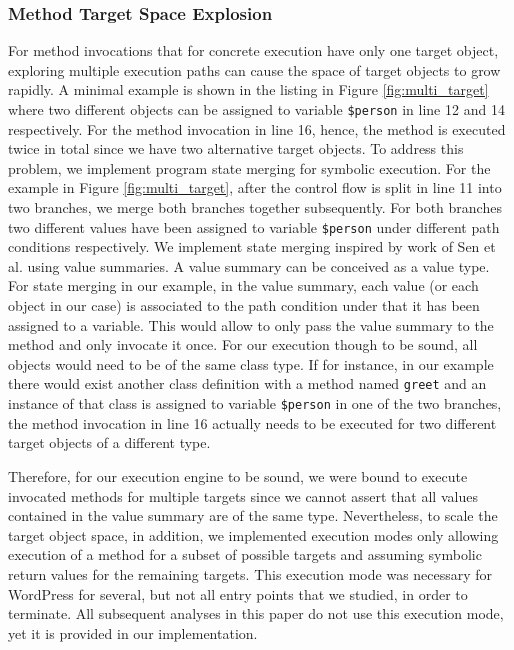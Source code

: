 \documentclass[sigconf]{acmart}
\renewcommand{\sf}[1]{\textsf{#1}}
\renewcommand{\tt}[1]{\texttt{#1}}
\begin{document}
\subsubsection{Method Target Space Explosion}
For method invocations that for concrete execution have only one target object,
exploring multiple execution paths can cause the space of target objects to
grow rapidly. A minimal example is shown in the listing in Figure
\ref{fig:multi_target} where two different objects can be assigned to variable \tt{\$person} in line 12 and
14 respectively. For the method invocation in line 16, hence, the method is
executed twice in total since we have two alternative target objects. To address this problem, we
implement program state merging for symbolic execution. For the example in
Figure \ref{fig:multi_target}, after the control flow is split in line 11 into
two branches, we merge both branches together subsequently. For both branches two different
values have been assigned to variable \tt{\$person} under different path
conditions respectively. We implement state merging inspired by work of Sen et al. 
\cite{Sen:2015:MMS:2786805.2786830} using value summaries. A value summary can be conceived as a value
type. For state merging in our example, in the value summary, each value (or
each object in our case) is associated to the path condition under that it has
been assigned to a variable. This would allow to only pass the value summary to
the method and only invocate it once. For our execution though to be sound, all
objects would need to be of the same class type. If for instance, in our
example there would exist another class definition with a method named
\tt{greet} and an instance of that class is assigned to variable \tt{\$person}
in one of the two branches, the method invocation in line 16 actually needs to be
executed for two different target objects of a different type.

Therefore, for our execution engine to be sound, we were bound to execute
invocated methods for multiple targets since we cannot assert that all values
contained in the value summary are of the same type. Nevertheless, to scale the
target object space, in addition, we implemented execution modes only allowing
execution of a method for a subset of possible targets and assuming symbolic
return values for the remaining targets. This execution mode was necessary for
\sf{WordPress} for several, but not all entry points that we studied, in order
to terminate. All subsequent analyses in this paper do not use this execution
mode, yet it is provided in our implementation.
\end{document}
